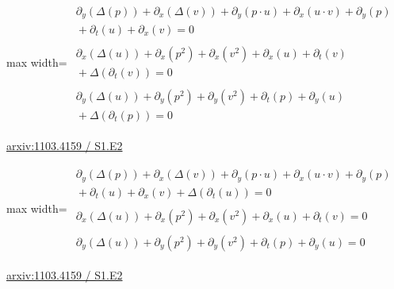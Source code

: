 \documentclass[UTF8,10pt,a4paper,fontset=mac]{ctexart}
\begin{document}
\begin{minipage}{\linewidth}\begin{center}\begin{adjustbox}{max width=\linewidth}$\displaystyle\begin{gathered}\begin{gathered}\partial_{y}(\Delta(p))+\partial_{x}(\Delta(v))+\partial_{y}(p\cdot u)+\partial_{x}(u\cdot v)+\partial_{y}(p)\\[-1pt]{}+\partial_{t}(u)+\partial_{x}(v)=0\end{gathered}\\[5pt]\begin{gathered}\partial_{x}(\Delta(u))+\partial_{x}(p^{2})+\partial_{x}(v^{2})+\partial_{x}(u)+\partial_{t}(v)\\[-1pt]{}+\Delta(\partial_{t}(v))=0\end{gathered}\\[5pt]\begin{gathered}\partial_{y}(\Delta(u))+\partial_{y}(p^{2})+\partial_{y}(v^{2})+\partial_{t}(p)+\partial_{y}(u)\\[-1pt]{}+\Delta(\partial_{t}(p))=0\end{gathered}\end{gathered}$\end{adjustbox}\end{center}{\small\href{https://arxiv.org/html/1103.4159#S1.E2}{arxiv:1103.4159 / S1.E2}}\par\end{minipage}\par\vspace{6mm}

\begin{minipage}{\linewidth}\begin{center}\begin{adjustbox}{max width=\linewidth}$\displaystyle\begin{gathered}\begin{gathered}\partial_{y}(\Delta(p))+\partial_{x}(\Delta(v))+\partial_{y}(p\cdot u)+\partial_{x}(u\cdot v)+\partial_{y}(p)\\[-1pt]{}+\partial_{t}(u)+\partial_{x}(v)+\Delta(\partial_{t}(u))=0\end{gathered}\\[5pt]\begin{gathered}\partial_{x}(\Delta(u))+\partial_{x}(p^{2})+\partial_{x}(v^{2})+\partial_{x}(u)+\partial_{t}(v)=0\end{gathered}\\[5pt]\begin{gathered}\partial_{y}(\Delta(u))+\partial_{y}(p^{2})+\partial_{y}(v^{2})+\partial_{t}(p)+\partial_{y}(u)=0\end{gathered}\end{gathered}$\end{adjustbox}\end{center}{\small\href{https://arxiv.org/html/1103.4159#S1.E2}{arxiv:1103.4159 / S1.E2}}\par\end{minipage}\par\vspace{6mm}
\end{document}
